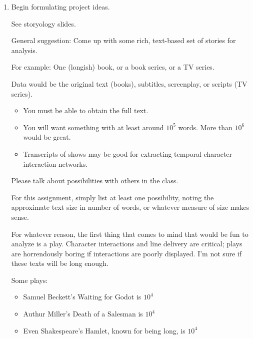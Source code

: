 \begin{enumerate}
  
\item

  Begin formulating project ideas.

  See storyology slides.
  
  General suggestion: Come up with some rich, text-based set of stories for analysis.

  For example: One (longish) book, or a book series, or a TV series.

  Data would be the original text (books), subtitles, screenplay, or scripts (TV series).

  \begin{itemize}
  \item 
    You must be able to obtain the full text.
  \item 
    You will want something with at least around $10^{5}$ words.
    More than $10^{6}$ would be great.
  \item 
    Transcripts of shows may be good for extracting
    temporal character interaction networks.
  \end{itemize}
  
  Please talk about possibilities with others in the class.
  
  For this assignment, simply list at least one possibility, noting the approximate text size
  in number of words, or whatever measure of size makes sense.

  
   \solutionstart


For whatever reason, the first thing that comes to mind that would be fun to analyze is a play. Character interactions and line delivery are critical; plays are horrendously boring if interactions are poorly displayed. I'm not sure if these texts will be long enough.
	
Some plays:
\begin{itemize}
	\item Samuel Beckett's Waiting for Godot is $10^4$
	\item Authur Miller's Death of a Salesman is $10^4$
	\item Even Shakespeare's Hamlet, known for being long, is $10^4$
\end{itemize}


\end{enumerate}
